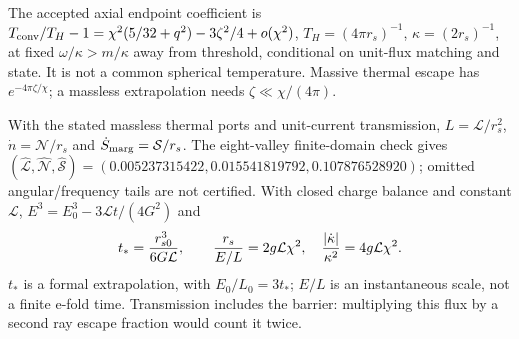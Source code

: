 The accepted axial endpoint coefficient is
$T_{\rm conv}/T_H-1=\chi^2(5/32+q^2)-3\zeta^2/4+o(\chi^2)$,
$T_H=(4\pi r_s)^{-1}$, $\kappa=(2r_s)^{-1}$, at fixed
$\omega/\kappa>m/\kappa$ away from threshold, conditional on unit-flux
matching and state. It is not a common spherical temperature. Massive
thermal escape has
$e^{-4\pi\zeta/\chi}$; a massless extrapolation needs
$\zeta\ll\chi/(4\pi)$.

With the stated massless thermal ports and unit-current transmission,
$L=\mathcal L/r_s^2$, $\dot n=\mathcal N/r_s$ and
$\dot S_{\rm marg}=\mathcal S/r_s$. The eight-valley finite-domain check
gives $(\widehat{\mathcal L},\widehat{\mathcal N},\widehat{\mathcal S})
=(0.005237315422,0.015541819792,0.107876528920)$; omitted angular/frequency
tails are not certified. With closed charge balance and constant
$\mathcal L$, $E^3=E_0^3-3\mathcal L t/(4G^2)$ and
\[
 t_*={r_{s0}^3\over6G\mathcal L},\qquad
 {r_s\over E/L}=2g\mathcal L\chi^2,\quad
 { |\dot\kappa|\over\kappa^2}=4g\mathcal L\chi^2.
\]
$t_*$ is a formal extrapolation, with $E_0/L_0=3t_*$; $E/L$ is an
instantaneous scale, not a finite e-fold time. Transmission includes the barrier: multiplying
this flux by a second ray escape fraction would count it twice.


